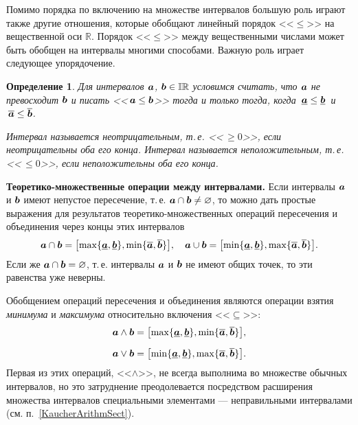 \documentclass[a5paper,openany]{book}
\newcommand{\mbf}[1]{\protect\text{\boldmath$#1$}}
\newcommand{\mbb}{\mathbb}
\newcommand{\ov}{\overline}
\newcommand{\un}{\underline}
\newtheorem{definition}{Определение}[section]
\begin{document}
{{Помимо порядка по включению на множестве интервалов большую роль играют также другие 
отношения, которые обобщают линейный порядок <<$\leq$>> на вещественной 
оси $\mbb{R}$. 
Порядок <<$\leq$>> между вещественными числами может быть обобщен на интервалы многими способами. Важную роль играет следующее упорядочение.
\begin{definition} 
	Для интервалов $\mbf{a}$, $\mbf{b}\in\mbb{IR}$ условимся считать, что
	\textsl{$\mbf{a}$ не превосходит $\mbf{b}$} и писать <<$\,\mbf{a}\leq 
	\mbf{b}$>> тогда и только тогда, когда $\,\un{\mbf{a}}\leq\un{\mbf{b}}\,$
	и $\,\ov{\mbf{a}}\leq\ov{\mbf{b}}$.  \par\noindent
	Интервал называется \textsl{неотрицательным}, т.\,е. <<$\,\geq 0$>>, если 
	неотрицательны оба его конца. Интервал называется \textsl{неположительным}, 
	т.\,е. <<$\,\leq 0$>>, если неположительны оба его конца. 
\end{definition}

{\bf Теоретико-множественные операции между интервалами.}    
Если интервалы $\mbf{a}$ и $\mbf{b}$ имеют непустое пересечение, т.\,е. $\mbf{a}
\cap \mbf{b} \neq\varnothing$, то можно дать простые выражения для результатов 
теоретико-множественных операций пересечения и объединения через концы этих интервалов 
\begin{align*} 
	\mbf{a}\cap\mbf{b} = 
	\bigl[\max\{\un{\mbf{a}}, \un{\mbf{b}}\}, \min\{\ov{\mbf{a}}, \ov{\mbf{b}}\}\bigr], 
\quad
	\mbf{a}\cup\mbf{b} = 
	\bigl[\min\{\un{\mbf{a}}, \un{\mbf{b}}\}, \max\{\ov{\mbf{a}}, \ov{\mbf{b}}\}\bigr].  
\end{align*} 
Если же $\mbf{a}\cap\mbf{b} = \varnothing$, т.\,е. интервалы $\mbf{a}$ и $\mbf{b}$ 
не имеют общих точек, то эти равенства уже неверны. 

Обобщением операций пересечения и объединения являются операции взятия \emph{минимума} 
и \emph{максимума} относительно включения <<$\subseteq$>>:  
\begin{align} 
	\mbf{a}\wedge\mbf{b} &= \label{InteMinExpr}
	\bigl[\max\{\un{\mbf{a}}, \un{\mbf{b}}\}, \min\{\ov{\mbf{a}}, \ov{\mbf{b}}\}\bigr], 
	\\[2mm]
	\mbf{a}\vee\mbf{b} &= \label{InteMaxExpr}
	\bigl[\min\{\un{\mbf{a}}, \un{\mbf{b}}\}, \max\{\ov{\mbf{a}}, \ov{\mbf{b}}\}\bigr].  
\end{align} 
Первая из этих операций, 
<<$\wedge$>>, не всегда выполнима во множестве обычных интервалов, но это затруднение 
преодолевается посредством расширения множества интервалов специальными элементами 
--- неправильными интервалами (см.  п.~\ref{KaucherArithmSect}). 


}}
\end{document}
